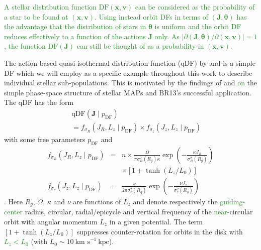 \documentclass[iop,revtex4]{emulateapj}
\newcommand{\vect}[1]{\boldsymbol{#1}}
\newcommand{\MAPs}{MAPs}
\newcommand{\NEW}[1]{\textcolor{ForestGreen}{#1}}
\newcommand{\OLD}[1]{}
\begin{document}
\NEW{A stellar distribution function $\text{DF}(\vect{x},\vect{v})$ can be considered as the probability of a star to be found at $(\vect{x},\vect{v})$. Using instead orbit DFs in terms of $(\vect{J},\vect{\theta})$ has the advantage that the distribution of stars in $\vect{\theta}$ is uniform and the orbit DF reduces effectively to a function of the actions $\vect{J}$ only. As $\left| \partial(\vect{J},\vect{\theta}) / \partial (\vect{x},\vect{v}) \right| = 1$, the function $\text{DF}(\vect{J})$ can still be thought of as a probability in $(\vect{x},\vect{v})$.}

The action-based quasi-isothermal distribution function (qDF) by \citet{2010MNRAS.401.2318B} and \citet{2011MNRAS.413.1889B} is a simple DF which we will employ as a specific example throughout this work to describe individual stellar sub-populations. This is motivated by the findings of \citet{2012ApJ...751..131B,2012ApJ...755..115B,2012ApJ...753..148B} and \citet{2013MNRAS.434..652T} \OLD{about}\NEW{on} the simple phase-space structure of stellar \MAPs{} and BR13's successful application. The qDF has the form
\begin{eqnarray}
&&\text{qDF}(\vect{J} \mid p_\text{DF}) \nonumber\\
&&= f_{\sigma_R}\left(J_R,L_z \mid p_\text{DF}\right) \times f_{\sigma_z}\left(J_z,L_z \mid p_\text{DF}\right)\label{eq:df_general}\end{eqnarray}
with some free parameters $p_\text{DF}$ and
\begin{eqnarray}
f_{\sigma_R}\left(J_R,L_z \mid p_\text{DF}\right) &=& n \times \frac{\Omega}{\pi\sigma_R^2(R_g) \kappa}\exp\left(-\frac{\kappa J_R}{\sigma_R^2(R_g)} \right) \nonumber\\
&& \times \left[1+\tanh\left(L_z/L_0\right) \right]\\
f_{\sigma_z}\left(J_z,L_z \mid p_\text{DF} \right) &=& \frac{\nu}{2 \pi \sigma_z^2(R_g)} \exp\left( -\frac{\nu J_z}{\sigma_z^2(R_g)} \right)
\end{eqnarray}
\citep{2011MNRAS.413.1889B}. Here $R_g$, $\Omega$,  $\kappa$ and $\nu$ are functions of $L_z$ and denote respectively the \OLD{(guiding-center)}\NEW{guiding-center} radius, circular, radial/epicycle and vertical frequency of the \NEW{near-}circular orbit with angular momentum $L_z$ in a given potential. The term $\left[1+\tanh\left(L_z/L_0\right) \right]$ suppresses counter-rotation for orbits in the disk with \OLD{$L \gg L_0$}\NEW{$L_z < L_0$} (with $L_0 \sim 10~\text{km s}^{-1}~ \text{kpc}$).
\end{document}
